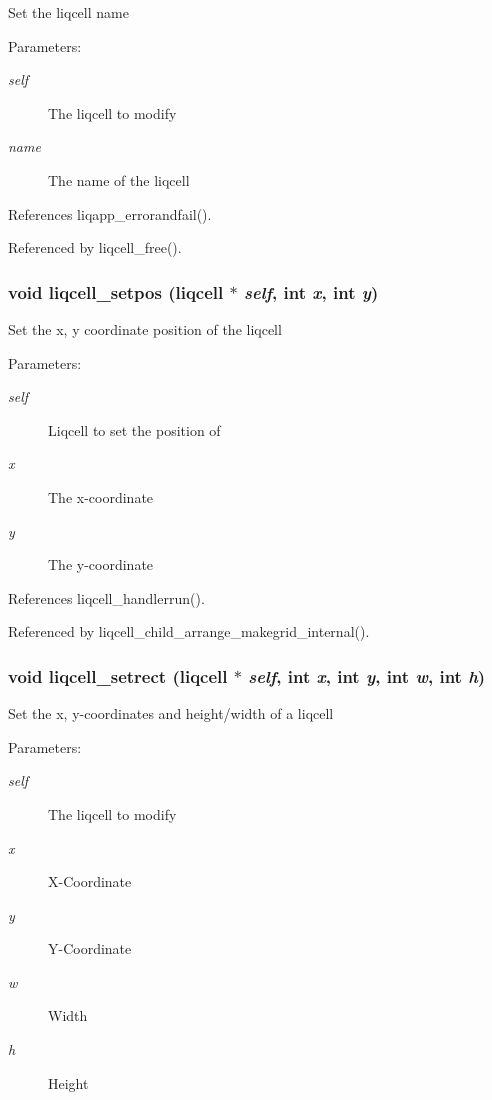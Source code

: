 Set the liqcell name \begin{Desc}
\item[Parameters:]
\begin{description}
\item[{\em self}]The liqcell to modify \item[{\em name}]The name of the liqcell \end{description}
\end{Desc}


References liqapp\_\-errorandfail().

Referenced by liqcell\_\-free().
\subsubsection[{liqcell\_\-setpos}]{\setlength{\rightskip}{0pt plus 5cm}void liqcell\_\-setpos (liqcell $\ast$ {\em self}, \/  int {\em x}, \/  int {\em y})}\label{d5/da2/liqcell_8c_29c63f821be5a97c33041c3f977756ab}


Set the x, y coordinate position of the liqcell \begin{Desc}
\item[Parameters:]
\begin{description}
\item[{\em self}]Liqcell to set the position of \item[{\em x}]The x-coordinate \item[{\em y}]The y-coordinate \end{description}
\end{Desc}


References liqcell\_\-handlerrun().

Referenced by liqcell\_\-child\_\-arrange\_\-makegrid\_\-internal().
\subsubsection[{liqcell\_\-setrect}]{\setlength{\rightskip}{0pt plus 5cm}void liqcell\_\-setrect (liqcell $\ast$ {\em self}, \/  int {\em x}, \/  int {\em y}, \/  int {\em w}, \/  int {\em h})}\label{d5/da2/liqcell_8c_96002145228977f59beff1bcdd4b7267}


Set the x, y-coordinates and height/width of a liqcell \begin{Desc}
\item[Parameters:]
\begin{description}
\item[{\em self}]The liqcell to modify \item[{\em x}]X-Coordinate \item[{\em y}]Y-Coordinate \item[{\em w}]Width \item[{\em h}]Height \end{description}
\end{Desc}


